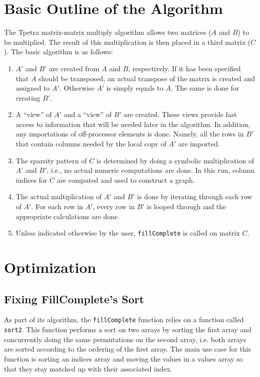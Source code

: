 \documentclass{article}
\newcommand{\Aprime}{\ensuremath{A'}\xspace}
\newcommand{\Bprime}{\ensuremath{B'}\xspace}
\begin{document}
\section{Basic Outline of the Algorithm}
The Tpetra matrix-matrix multiply algorithm allows two matrices ($A$ and $B$) to be multiplied. The result of this 
multiplication is then placed in a third matrix ($C$).
The basic algorithm is as follows:
\begin{enumerate}
  \item \Aprime and \Bprime are created from $A$ and $B$, respectively. If it has been specified that $A$ should be transposed, an actual 
  transpose of the matrix is created and assigned to \Aprime. Otherwise \Aprime is simply equals to $A$. The same is done for 
  creating \Bprime.
  \item A ``view'' of \Aprime and a ``view'' of \Bprime are created. These views provide fast access to information that 
  will be needed later in the algorithm. In addition, any importations of off-processor elements is done. Namely, all the 
  rows in \Bprime that contain columns needed by the local copy of \Aprime are imported.
  \item The sparsity pattern of $C$ is determined by doing a symbolic multiplication of \Aprime and \Bprime, i.e., no actual
  numeric computations are done. In this run, 
  column indices for $C$ are computed and used to construct a graph.
  \item The actual multiplication of \Aprime and \Bprime is done by iterating through each row of \Aprime. For each row in 
  \Aprime, every row in \Bprime is looped through and the appropriate calculations are done.
  \item Unless indicated otherwise by the user, \verb!fillComplete! is called on matrix $C$.
\end{enumerate}

\section{Optimization}

\subsection{Fixing FillComplete's Sort}
As part of its algorithm, the \verb!fillComplete! function relies on a function called \verb!sort2!. This function performs a sort 
on two arrays by sorting the first array and concurrently doing the same permutations on the second array, 
i.e. both arrays are sorted according to the ordering of the first array. The main use case for this function is sorting 
an indices array and moving the values in a values array so that they stay matched up with their associated index.
\end{document}
